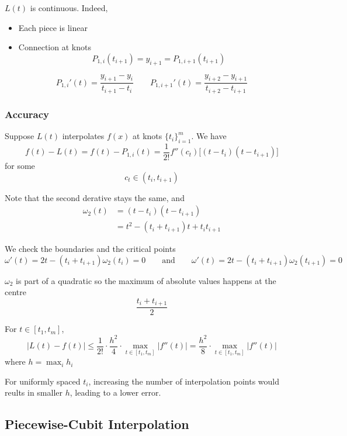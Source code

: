 \begin{remark}
    \( L(t) \) is continuous. Indeed,
    \begin{itemize}
        \item Each piece is linear
        \item Connection at knots \[
                  P_{1,i}(t_{i+1}) = y_{i+1} = P_{1,{i+1}}(t_{i+1})
              \]
    \end{itemize}
\end{remark}

\begin{remark}
    \[
        {P_{1,i}}'(t) = \frac{y_{i+1} - y_i}{t_{i+1} - t_i}
        \qquad
        {P_{1,i+1}}'(t) = \frac{y_{i+2}-y_{i+1}}{t_{i+2}-t_{i+1}}
    \]
\end{remark}

\subsubsection{Accuracy}

Suppose \( L(t) \) interpolates \( f(x) \) at knots \( \{ t_i \}_{i=1}^{m} \).
We have \[
    f(t) - L(t) = f(t) - P_{1,i}(t) = \frac{1}{2!} f''(c_t) \Big[ (t - t_i)(t - t_{i+1}) \Big]
\] for some \[
    c_t \in ( t_i, t_{i+1} )
\]

Note that the second derative stays the same, and \begin{align*}
    \omega_2(t)
     & = (t - t_i)(t - t_{i+1})
    \\
     & = t^2 - (t_i + t_{i+1})t + t_{i}t_{i+1}
\end{align*}

We check the boundaries and the critical points \[
    \omega'(t) = 2t - (t_i+t_{i+1})\omega_2(t_i) = 0
    \qquad \text{and} \qquad
    \omega'(t) = 2t - (t_i+t_{i+1})\omega_2(t_{i+1}) = 0
\]

\( \omega_2 \) is part of a quadratic so the maximum of absolute values happens at the centre \[
    \frac{t_{i} + t_{i+1}}{2}
\]


For \( t \in [t_1, t_m] \), \[
    | L(t) - f(t) | \leq \frac{1}{2!} \cdot \frac{h^2}{4} \cdot \max_{t \in [t_1, t_m]} | f''(t) | = \frac{h^2}{8} \cdot \max_{t \in [t_1, t_m]} | f''(t) |
\] where \( h = \max_{i} h_i \)

For uniformly spaced \( t_i \), increasing the number of interpolation points would reults in smaller \( h \), leading to a lower error.

\subsection{Piecewise-Cubit Interpolation}

